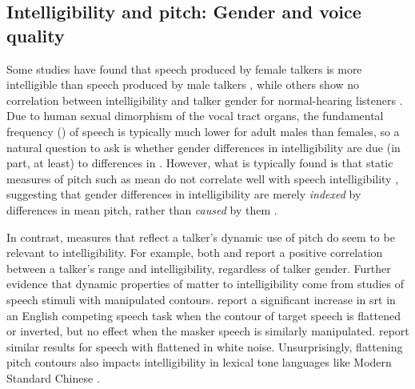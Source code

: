 \subsection[Intelligibility and pitch]{Intelligibility and pitch: Gender and voice quality\label{sec:IntelPitch}}
Some studies have found that speech produced by female talkers is more intelligible than speech produced by male talkers \citep{BradlowEtAl1996, HazanMarkham2004}, while others show no correlation between intelligibility and talker gender for normal-hearing listeners \citep{KilicOgut2004, Neel2008}.  Due to human sexual dimorphism of the vocal tract organs, the fundamental frequency (\fo) of speech is typically much lower for adult males than females, so a natural question to ask is whether gender differences in intelligibility are due (in part, at least) to differences in \fo.  However, what is typically found is that static measures of pitch such as mean \fo{} do not correlate well with speech intelligibility \citep[\eg,][]{PichenyEtAl1986, BradlowEtAl1996, HazanMarkham2004, LuCooke2009}, suggesting that gender differences in intelligibility are merely {\em indexed} by differences in mean pitch, rather than {\em caused} by them \citep[cf. discussion in][]{BradlowEtAl1996}.

In contrast, measures that reflect a talker’s dynamic use of pitch do seem to be relevant to intelligibility.  For example, both \citet{BradlowEtAl1996} and \citet{McCloyEtAl2013} report a positive correlation between a talker’s \fo{} range and intelligibility, regardless of talker gender.  %
Further evidence that dynamic properties of \fo{} matter to intelligibility come from studies of speech stimuli with manipulated \fo{} contours.  \citet{BinnsCulling2007} report a significant increase in \ac{srt} in an English competing speech task when the \fo{} contour of target speech is flattened or inverted, but no effect when the masker speech is similarly manipulated.  \citet{WatsonSchlauch2008} report similar results for speech with flattened \fo{} in white noise.  Unsurprisingly, flattening pitch contours also impacts intelligibility in lexical tone languages like Modern Standard Chinese \citep{PatelEtAl2010}.  

